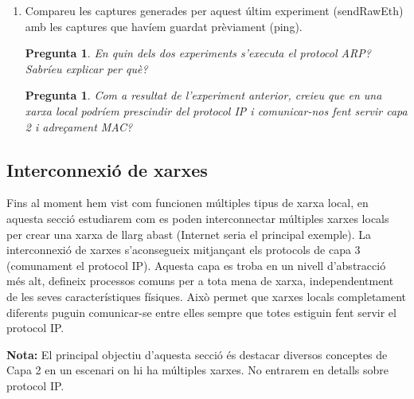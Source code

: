 \documentclass[12pt,a4paper]{article}
\newcounter{exercises}
\newtheorem{exer}[exercises]{Pregunta}
\begin{document}
\begin{enumerate}

\item Compareu les captures generades per aquest últim experiment (sendRawEth) amb les captures que havíem guardat prèviament (ping).

\begin{exer} En quin dels dos experiments s'executa el protocol ARP? Sabríeu explicar per què? \end{exer}
\begin{exer} Com a resultat de l'experiment anterior, creieu que en una xarxa local podríem prescindir del protocol IP i comunicar-nos fent servir capa 2 i adreçament MAC? \end{exer}
\end{enumerate}

\subsection{Interconnexió de xarxes}
Fins al moment hem vist com funcionen múltiples tipus de xarxa local, en aquesta secció estudiarem com es poden interconnectar múltiples xarxes locals per crear una xarxa de llarg abast (Internet seria el principal exemple). La interconnexió de xarxes s'aconsegueix mitjançant els protocols de capa 3 (comunament el protocol IP). Aquesta capa es troba en un nivell d'abstracció més alt, defineix processos comuns per a tota mena de xarxa, independentment de les seves característiques físiques. Això permet que xarxes locals completament diferents puguin comunicar-se entre elles sempre que totes estiguin fent servir el protocol IP.

\textbf{Nota:} El principal objectiu d'aquesta secció és destacar diversos conceptes de Capa 2 en un escenari on hi ha múltiples xarxes. No entrarem en detalls sobre protocol IP.
\end{document}
